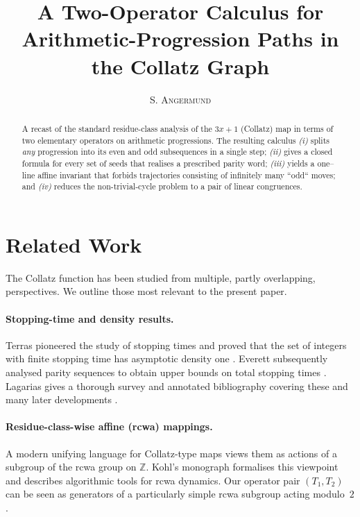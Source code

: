 \documentclass{article}
\title{A Two-Operator Calculus for Arithmetic-Progression Paths in the Collatz Graph}
\author{\textsc{S. Angermund}}
\theoremstyle{definition}
\begin{document}
\maketitle

\begin{abstract}
\noindent
A recast of the standard residue-class analysis of the \(3x+1\) (Collatz) map in
terms of two elementary operators on arithmetic progressions.  The resulting
calculus \emph{(i)} splits \emph{any} progression into its even and odd
subsequences in a single step; \emph{(ii)} gives a closed formula for every set
of seeds that realises a prescribed parity word; \emph{(iii)} yields a
one–line affine invariant that forbids trajectories consisting of infinitely
many “odd“ moves; and \emph{(iv)} reduces the non-trivial-cycle problem to a pair of linear congruences.
\end{abstract}

\section*{Related Work}\label{sec:related}

The Collatz function has been studied from multiple, partly overlapping,
perspectives.  We outline those most relevant to the present paper.

\paragraph{Stopping-time and density results.}
Terras pioneered the study of stopping times and proved that the set of
integers with finite stopping time has asymptotic density one
\cite{Terras1976}.  Everett subsequently analysed parity sequences to obtain
upper bounds on total stopping times \cite{Everett1977}.  Lagarias gives a
thorough survey and annotated bibliography covering these and many later
developments \cite{LagariasBib2003}.

\paragraph{Residue-class-wise affine (rcwa) mappings.}
A modern unifying language for Collatz-type maps views them as actions of a
subgroup of the rcwa group on \(\mathbb Z\).  Kohl’s monograph
\cite{KohlRCWA2012} formalises this viewpoint and describes algorithmic tools
for rcwa dynamics.  Our operator pair \((T_1,T_2)\) can be seen as generators
of a particularly simple rcwa subgroup acting modulo~\(2\).
\end{document}
